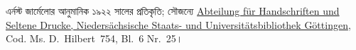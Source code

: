 এর্নস্ট জার্মেলোর আনুমানিক ১৯২২ সালের প্রতিকৃতি; সৌজন্যে
\href{http://www.sub.uni-goettingen.de/en/contact/departments-a-z/departmental-and-unit-details/abteilunggruppe/handschriften-und-seltene-drucke/}{Abteilung
f\"ur Handschriften und Seltene Drucke, Nieders\"achsische Staats- und
Universit\"atsbibliothek G\"ottingen}, Cod. Ms. D.~Hilbert~754, Bl.~6 Nr.~25।
